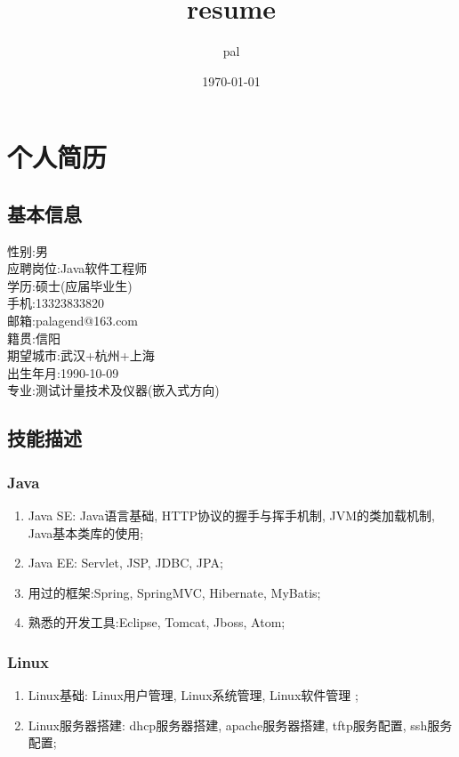 \documentclass[11pt]{ctexart}
\author{pal}
\date{\today}
\title{resume}
\begin{document}
\maketitle
\tableofcontents

\section{个人简历}
\label{sec-1}
\subsection{基本信息}
\label{sec-1-1}
性别:男\\
应聘岗位:Java软件工程师\\
学历:硕士(应届毕业生)\\
手机:13323833820\\
邮箱:palagend@163.com\\
籍贯:信阳\\
期望城市:武汉+杭州+上海\\
出生年月:1990-10-09\\
专业:测试计量技术及仪器(嵌入式方向)\\
\subsection{技能描述}
\label{sec-1-2}
\subsubsection{Java}
\label{sec-1-2-1}
\begin{enumerate}
\item Java SE: Java语言基础, HTTP协议的握手与挥手机制, JVM的类加载机制, Java基本类库的使用;
\item Java EE: Servlet, JSP, JDBC, JPA;
\item 用过的框架:Spring, SpringMVC, Hibernate, MyBatis;
\item 熟悉的开发工具:Eclipse, Tomcat, Jboss, Atom;
\end{enumerate}
\subsubsection{Linux}
\label{sec-1-2-2}
\begin{enumerate}
\item Linux基础: Linux用户管理, Linux系统管理, Linux软件管理 ;
\item Linux服务器搭建: dhcp服务器搭建, apache服务器搭建, tftp服务配置, ssh服务配置;
\end{enumerate}
\end{document}
